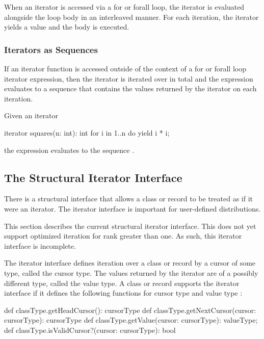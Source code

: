 When an iterator is accessed via a for or forall loop, the iterator is
evaluated alongside the loop body in an interleaved manner.  For each
iteration, the iterator yields a value and the body is executed.

\subsubsection{Iterators as Sequences}
\label{Iterators_as_Sequences}

If an iterator function is accessed outside of the context of a for or
forall loop iterator expression, then the iterator is iterated over in
total and the expression evaluates to a sequence that contains the
values returned by the iterator on each iteration.
\begin{example}
Given an iterator
\begin{chapel}
iterator squares(n: int): int {
  for i in 1..n do
    yield i * i;
}
\end{chapel}
the expression  evaluates to the sequence .
\end{example}

\subsection{The Structural Iterator Interface}
\label{Iterator_Interface}

There is a structural interface that allows a class or record to be
treated as if it were an iterator.  The iterator interface is
important for user-defined distributions.

\begin{implementation}
This section describes the current structural iterator interface.
This does not yet support optimized iteration for rank greater than
one.  As such, this iterator interface is incomplete.
\end{implementation}

The iterator interface defines iteration over a class or record by a
cursor of some type, called the cursor type.  The values returned by
the iterator are of a possibly different type, called the value type.
A class or record  supports the iterator interface if
it defines the following functions for cursor type 
and value type :
\begin{chapel}
def classType.getHeadCursor(): cursorType
def classType.getNextCursor(cursor: cursorType): cursorType
def classType.getValue(cursor: cursorType): valueType;
def classType.isValidCursor?(cursor: cursorType): bool
\end{chapel}

